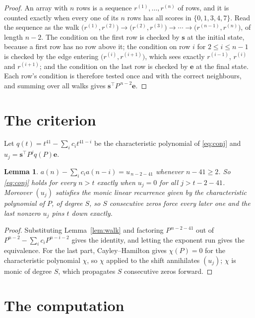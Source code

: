 \documentclass[11pt,a4paper]{article}
\theoremstyle{plain}
\newtheorem{lemma}[theorem]{Lemma}
\theoremstyle{definition}
\begin{document}
\begin{proof}
An array with $n$ rows is a sequence $r^{(1)},\dots,r^{(n)}$ of rows, and it is counted
exactly when every one of its $n$ rows has all scores in $\{0,1,3,4,7\}$. Read the sequence as the
walk $\bigl(r^{(1)},r^{(2)}\bigr)\to\bigl(r^{(2)},r^{(3)}\bigr)\to\cdots\to
\bigl(r^{(n-1)},r^{(n)}\bigr)$, of length $n-2$. The condition on the first row is
checked by $\mathbf{s}$ at the initial state, because a first row has no row above it; the
condition on row $i$ for $2\le i\le n-1$ is checked by the edge entering
$\bigl(r^{(i)},r^{(i+1)}\bigr)$, which sees exactly $r^{(i-1)}$, $r^{(i)}$ and
$r^{(i+1)}$; and the condition on the last row is checked by $\mathbf{e}$ at the final
state. Each row's condition is therefore tested once and with the correct neighbours, and
summing over all walks gives $\mathbf{s}^{\!\top}P^{\,n-2}\mathbf{e}$.
\end{proof}

\section{The criterion}

Let $q(t)=t^{41}-\sum_i c_i t^{41-i}$ be the characteristic polynomial of
\eqref{eq:conj} and $u_j=\mathbf{s}^{\!\top}P^{j}q(P)\mathbf{e}$.

\begin{lemma}\label{lem:crit}
$a(n)-\sum_i c_i a(n-i)=u_{\,n-2-41}$ whenever $n-41\ge2$. So \eqref{eq:conj}
holds for every $n>t$ exactly when $u_j=0$ for all $j>t-2-41$. Moreover $(u_j)$
satisfies the monic linear recurrence given by the characteristic polynomial of $P$, of
degree $S$, so $S$ consecutive zeros force every later one and the last nonzero $u_j$ pins
$t$ down exactly.
\end{lemma}

\begin{proof}
Substituting Lemma~\ref{lem:walk} and factoring $P^{\,n-2-41}$ out of
$P^{n-2}-\sum_i c_i P^{n-i-2}$ gives the identity, and letting the exponent run gives the
equivalence. For the last part, Cayley--Hamilton gives $\chi(P)=0$ for the characteristic
polynomial $\chi$, so $\chi$ applied to the shift annihilates $(u_j)$; $\chi$ is monic of
degree $S$, which propagates $S$ consecutive zeros forward.
\end{proof}

\section{The computation}
\end{document}
